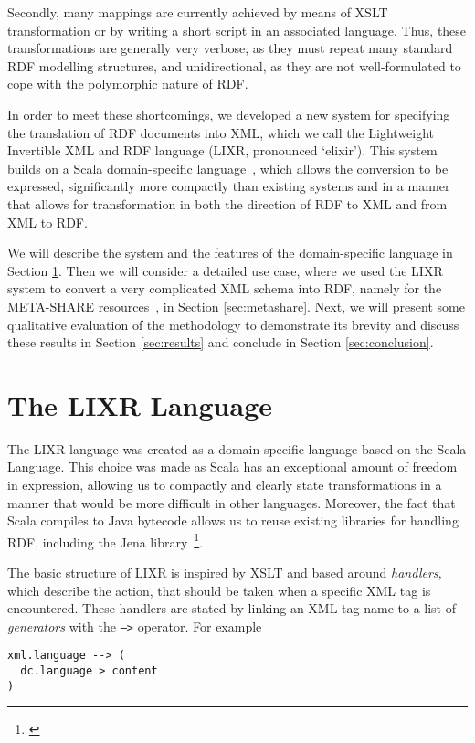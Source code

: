 \documentclass{acm_proc_article-sp}
\begin{document}
Secondly, many mappings are currently achieved by means of XSLT transformation or 
by writing a short script in an associated language. Thus, these transformations
are generally very verbose, as they must repeat many standard RDF modelling
structures, and unidirectional, as they are not well-formulated to cope with the 
polymorphic nature of RDF.

In order to meet these shortcomings, we developed a new system for specifying the
translation of RDF documents into XML, which we call the Lightweight Invertible
XML and RDF language (LIXR, pronounced `elixir'). This system builds on a 
Scala domain-specific language~\cite[DSL]{}, which allows the conversion to be
expressed, significantly more compactly than existing systems and in a manner
that allows for transformation in both the direction of RDF to XML and from XML
to RDF.

We will describe the system and the features of the domain-specific language in Section
\ref{sec:dsl}. Then we will consider a detailed use case, where we used the LIXR
system to convert a very complicated XML schema into RDF, namely for the META-SHARE
resources~\cite{mccrae2015ontology,xyz}, in Section \ref{sec:metashare}. Next, we will present some qualitative evaluation
of the methodology to demonstrate its brevity and discuss these results in Section
\ref{sec:results} and conclude in Section \ref{sec:conclusion}.

\section{The LIXR Language}
\label{sec:dsl}

The LIXR language was created as a domain-specific language based on the Scala
Language. This choice was made as Scala has an exceptional amount of freedom in
expression, allowing us to compactly and clearly state transformations in a manner
that would be more difficult in other languages. Moreover, the fact that Scala
compiles to Java bytecode allows us to reuse existing libraries for handling
RDF, including the Jena library~\footnote{\url{}}.

The basic structure of LIXR is inspired by XSLT and based around \emph{handlers},
which describe the action, that should be taken when a specific XML tag is 
encountered. These handlers are stated by linking an XML tag name to a list
of \emph{generators} with the {\tt -->} operator. For example

\begin{verbatim}
xml.language --> (
  dc.language > content
)
\end{verbatim}
\end{document}
